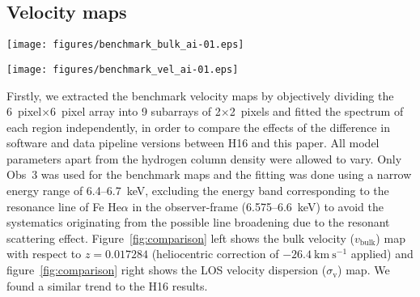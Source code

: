 \subsection{Velocity maps}
\label{sec:velocity}

\begin{figure*}
 \begin{minipage}{0.495\hsize}
  \centering
  \texttt{[image: figures/benchmark\_bulk\_ai-01.eps]}
 \end{minipage}
 \begin{minipage}{0.495\hsize}
  \centering
  \texttt{[image: figures/benchmark\_vel\_ai-01.eps]}
 \end{minipage}
 \caption{Benchmark velocity maps. {\it Left:} bulk velocity ($v_\mathrm{bulk}$) map with respect to $z=0.017284$ (heliocentric correction of $-26.4~\mathrm{km~s^{-1}}$ applied). {\it Right:} LOS velocity dispersion ($\sigma_\mathrm{v}$) map. The unit of the values is km~s$^{-1}$. Chandra X-ray contours are overlaid. The best-fitting value is overlaid on each region. Only Obs~3 is used and PSF correction is not applied.}\label{fig:comparison}
\end{figure*}

Firstly, we extracted the benchmark velocity maps by objectively dividing the 6~pixel$\times$6~pixel array into 9 subarrays of 2$\times$2~pixels and fitted the spectrum of each region independently, in order to compare the effects of the difference in software and data pipeline versions between H16 and this paper. All model parameters apart from the hydrogen column density were allowed to vary. Only Obs~3 was used for the benchmark maps and the fitting was done using a narrow energy range of 6.4--6.7~keV, excluding the energy band corresponding to the resonance line of Fe He$\alpha$ in the observer-frame (6.575--6.6~keV) to avoid the systematics originating from the possible line broadening due to the resonant scattering effect. Figure~\ref{fig:comparison} left shows the bulk velocity ($v_\mathrm{bulk}$) map with respect to $z=0.017284$ (heliocentric correction of $-26.4~\mathrm{km~s^{-1}}$ applied) and figure~\ref{fig:comparison} right shows the LOS velocity dispersion ($\sigma_\mathrm{v}$) map. We found a similar trend to the H16 results.


